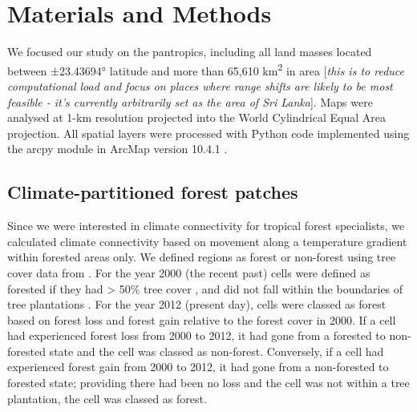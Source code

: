 \documentclass[12pt,a4paper,]{report}
\theoremstyle{definition}
\theoremstyle{definition}
\theoremstyle{definition}
\theoremstyle{remark}
\begin{document}
\section{Materials and Methods}\label{materials-and-methods}

We focused our study on the pantropics, including all land masses
located between ±23.43694° latitude and more than 65,610
km\textsuperscript{2} in area {[}\emph{this is to reduce computational
load and focus on places where range shifts are likely to be most
feasible - it's currently arbitrarily set as the area of Sri Lanka}{]}.
Maps were analysed at 1-km resolution projected into the World
Cylindrical Equal Area projection. All spatial layers were processed
with Python code implemented using the arcpy module in ArcMap version
10.4.1 \citep{esri_arcgis}.

\subsection{Climate-partitioned forest
patches}\label{climate-partitioned-forest-patches}

Since we were interested in climate connectivity for tropical forest
specialists, we calculated climate connectivity based on movement along
a temperature gradient within forested areas only. We defined regions as
forest or non-forest using tree cover data from
\citet{hansen_high-resolution_2013}. For the year 2000 (the recent past)
cells were defined as forested if they had \textgreater{} 50\% tree
cover \citep{hansen_high-resolution_2013}, and did not fall within the
boundaries of tree plantations \citep{transparent_world_tree_2015}. For
the year 2012 (present day), cells were classed as forest based on
forest loss and forest gain \citep{hansen_high-resolution_2013} relative
to the forest cover in 2000. If a cell had experienced forest loss from
2000 to 2012, it had gone from a forested to non-forested state and the
cell was classed as non-forest. Conversely, if a cell had experienced
forest gain from 2000 to 2012, it had gone from a non-forested to
forested state; providing there had been no loss and the cell was not
within a tree plantation, the cell was classed as forest.
\end{document}
